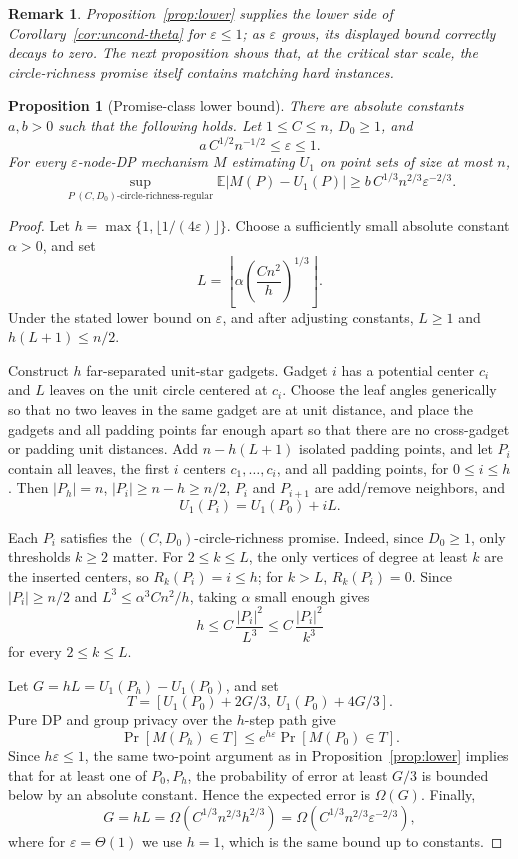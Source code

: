 \documentclass[11pt]{article}
\newtheorem{proposition}[theorem]{Proposition}
\newtheorem{remark}[theorem]{Remark}
\newcommand{\eps}{\varepsilon}
\begin{document}
\begin{remark}
Proposition~\ref{prop:lower} supplies the lower side of Corollary~\ref{cor:uncond-theta} for \(\eps\le1\); as \(\eps\) grows, its displayed bound correctly decays to zero. The next proposition shows that, at the critical star scale, the circle-richness promise itself contains matching hard instances.
\end{remark}

\begin{proposition}[Promise-class lower bound]
\label{prop:promise-lower}
There are absolute constants \(a,b>0\) such that the following holds. Let \(1\le C\le n\), \(D_0\ge1\), and
\[
a\,C^{1/2}n^{-1/2}\le \eps\le 1.
\]
For every \(\eps\)-node-DP mechanism \(M\) estimating \(U_1\) on point sets of size at most \(n\),
\[
\sup_{P\ \text{\((C,D_0)\)-circle-richness-regular}}
\mathbb{E}|M(P)-U_1(P)|
\ge b\,C^{1/3}n^{2/3}\eps^{-2/3}.
\]
\end{proposition}

\begin{proof}
Let \(h=\max\{1,\lfloor 1/(4\eps)\rfloor\}\). Choose a sufficiently small absolute constant \(\alpha>0\), and set
\[
L=\left\lfloor \alpha\left(\frac{C n^2}{h}\right)^{1/3}\right\rfloor.
\]
Under the stated lower bound on \(\eps\), and after adjusting constants, \(L\ge1\) and \(h(L+1)\le n/2\).

Construct \(h\) far-separated unit-star gadgets. Gadget \(i\) has a potential center \(c_i\) and \(L\) leaves on the unit circle centered at \(c_i\). Choose the leaf angles generically so that no two leaves in the same gadget are at unit distance, and place the gadgets and all padding points far enough apart so that there are no cross-gadget or padding unit distances. Add \(n-h(L+1)\) isolated padding points, and let \(P_i\) contain all leaves, the first \(i\) centers \(c_1,\ldots,c_i\), and all padding points, for \(0\le i\le h\). Then \(|P_h|=n\), \(|P_i|\ge n-h\ge n/2\), \(P_i\) and \(P_{i+1}\) are add/remove neighbors, and
\[
U_1(P_i)=U_1(P_0)+iL.
\]

Each \(P_i\) satisfies the \((C,D_0)\)-circle-richness promise. Indeed, since \(D_0\ge1\), only thresholds \(k\ge2\) matter. For \(2\le k\le L\), the only vertices of degree at least \(k\) are the inserted centers, so \(R_k(P_i)=i\le h\); for \(k>L\), \(R_k(P_i)=0\). Since \(|P_i|\ge n/2\) and \(L^3\le \alpha^3 Cn^2/h\), taking \(\alpha\) small enough gives
\[
h\le C\,\frac{|P_i|^2}{L^3}\le C\,\frac{|P_i|^2}{k^3}
\]
for every \(2\le k\le L\).

Let \(G=hL=U_1(P_h)-U_1(P_0)\), and set
\[
T=[U_1(P_0)+2G/3,\ U_1(P_0)+4G/3].
\]
Pure DP and group privacy over the \(h\)-step path give
\[
\Pr[M(P_h)\in T]\le e^{h\eps}\Pr[M(P_0)\in T].
\]
Since \(h\eps\le1\), the same two-point argument as in Proposition~\ref{prop:lower} implies that for at least one of \(P_0,P_h\), the probability of error at least \(G/3\) is bounded below by an absolute constant. Hence the expected error is \(\Omega(G)\). Finally,
\[
G=hL=\Omega\!\left(C^{1/3}n^{2/3}h^{2/3}\right)
=\Omega\!\left(C^{1/3}n^{2/3}\eps^{-2/3}\right),
\]
where for \(\eps=\Theta(1)\) we use \(h=1\), which is the same bound up to constants.
\end{proof}
\end{document}
